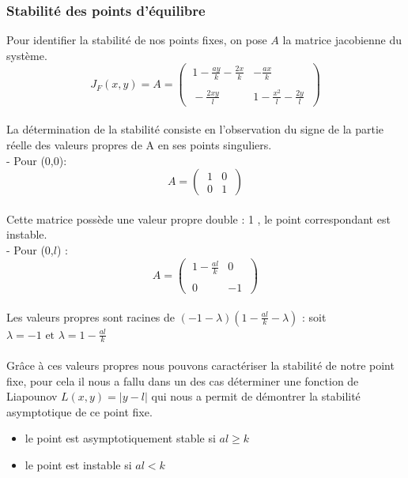 \documentclass{article}
\begin{document}
\newpage
\subsubsection{Stabilité des points d'équilibre}
\noindent
Pour identifier la stabilité de nos points fixes,  on pose $A$ la matrice jacobienne du système.\\

\begin{equation*}
    J_{F}(x,y) = A =
    \begin{pmatrix}
        \ 1- \frac{ay}{k} - \frac{2x}{k} & - \frac{ax}{k}\ \\\\
        \ - \frac{2xy}{l}  & 1 - \frac{x^{2}}{l} - \frac{2y}{l}\ 
    \end{pmatrix}
\end{equation*}\\

\noindent
La détermination de la stabilité consiste en l'observation du signe de la partie réelle des valeurs propres de A en ses points singuliers.\\

\vfill
\noindent
- Pour (0,0):
\begin{equation*}
    A =
    \begin{pmatrix}
        \ 1 & 0 \phantom{\ }\\
        \ 0 & 1 \phantom{\ }
    \end{pmatrix}
\end{equation*}\\
Cette matrice possède une valeur propre double : 1 , le point correspondant est instable.\\

\vfill
\noindent
- Pour (0,$l$) :
\begin{equation*}
    A = 
    \begin{pmatrix}
        \ 1- \frac{al}{k}  & 0 \phantom{\ }\\\\
        \ 0  & -1 \phantom{\ }
    \end{pmatrix}
\end{equation*}\\
Les valeurs propres sont racines de $(-1 - \lambda)(1- \frac{al}{k} - \lambda)$ : soit $\lambda = -1 \text{ et } \lambda = 1 - \frac{al}{k}$\\\\
Grâce à ces valeurs propres nous pouvons caractériser la stabilité de notre point fixe, pour cela il nous a fallu dans un des cas déterminer une fonction de Liapounov $L(x,y) = |y - l|$ qui nous a permit de démontrer la stabilité asymptotique de ce point fixe.
\begin{itemize}
    \item le point est asymptotiquement stable si $al \geqslant k$
    \item le point est instable si $al < k$
\end{itemize}
\end{document}
